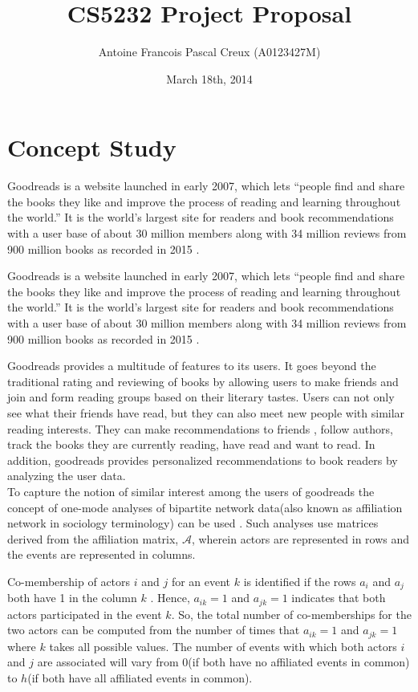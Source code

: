 \documentclass[11pt]{article}
\title{\textbf{CS5232 Project Proposal\\} }
\author{Antoine Francois Pascal Creux (A0123427M)}
\date{March 18th, 2014}
\begin{document}
\maketitle


\section{Concept Study}
Goodreads is a website launched in early 2007, which lets ``people find and share the books they like and improve the process of reading and learning throughout the world.'' It is the world's largest site for readers and book recommendations with a user base of about  30 million members along with 34 million reviews from 900 million books as recorded in 2015 \cite{goodreads:aboutus}.

Goodreads is a website launched in early 2007, which lets ``people find and share the books they like and improve the process of reading and learning throughout the world.'' It is the world’s largest site for readers and book recommendations with a user base of about  30 million members along with 34 million reviews from 900 million books as recorded in 2015 \cite{goodreads:aboutus}.

Goodreads provides a multitude of features to its users. It goes beyond the traditional rating and reviewing of books by allowing users to make friends and join and form reading groups based on their literary tastes. Users can not only see what their friends have read, but they can also meet new people with similar reading interests. They can make recommendations to friends , follow authors, track the books they are currently reading, have read and want to read. In addition, goodreads provides personalized recommendations to book readers by analyzing the user data. \\

To capture the notion of similar interest among the users of goodreads  the concept of one-mode analyses of bipartite network data(also known as affiliation network in sociology terminology) can be used \cite{wasserman}. Such analyses use matrices derived from the affiliation matrix, $\mathcal{A}$, wherein actors are represented in rows and the events are represented in columns.

Co-membership of actors $i$ and $j$ for an event $k$ is identified if the rows $a_i$ and $a_j$ both have 1 in the column $k$ . Hence,  $a_{ik} = 1$ and $a_{jk} = 1$ indicates that both actors participated in the event $k$. So, the total number of co-memberships for the two actors can be computed from the number of times that $a_{ik} = 1$ and $a_{jk} = 1$ where $k$ takes all possible values. The number of events with which both actors $i$ and $j$ are associated will vary from  0(if both have no affiliated events in common) to $h$(if both have all affiliated events in common).\\
\end{document}
